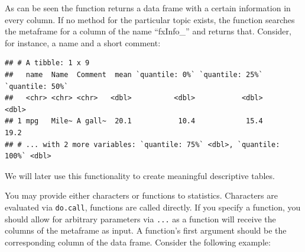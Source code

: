 \documentclass[]{report}
\newenvironment{Shaded}{\begin{snugshade}}{\end{snugshade}}
\newcommand{\KeywordTok}[1]{\textcolor[rgb]{0.13,0.29,0.53}{\textbf{#1}}}
\newcommand{\DataTypeTok}[1]{\textcolor[rgb]{0.13,0.29,0.53}{#1}}
\newcommand{\StringTok}[1]{\textcolor[rgb]{0.31,0.60,0.02}{#1}}
\newcommand{\OperatorTok}[1]{\textcolor[rgb]{0.81,0.36,0.00}{\textbf{#1}}}
\newcommand{\NormalTok}[1]{#1}
\theoremstyle{definition}
\theoremstyle{definition}
\theoremstyle{definition}
\theoremstyle{remark}
\begin{document}
As can be seen the function returns a data frame with a certain
information in every column. If no method for the particular topic
exists, the function searches the metaframe for a column of the name
``fxInfo\_'' and returns that. Consider, for instance, a name and a
short comment:

\begin{Shaded}
\end{Shaded}

\begin{verbatim}
## # A tibble: 1 x 9
##   name  Name  Comment  mean `quantile: 0%` `quantile: 25%` `quantile: 50%`
##   <chr> <chr> <chr>   <dbl>          <dbl>           <dbl>           <dbl>
## 1 mpg   Mile~ A gall~  20.1           10.4            15.4            19.2
## # ... with 2 more variables: `quantile: 75%` <dbl>, `quantile: 100%` <dbl>
\end{verbatim}

We will later use this functionality to create meaningful descriptive
tables.

You may provide either characters or functions to statistics. Characters
are evaluated via \texttt{do.call}, functions are called directly. If
you specify a function, you should allow for arbitrary parameters via
\texttt{...} as a function will receive the columns of the metaframe as
input. A function's first argument should be the corresponding column of
the data frame. Consider the following example:
\end{document}
